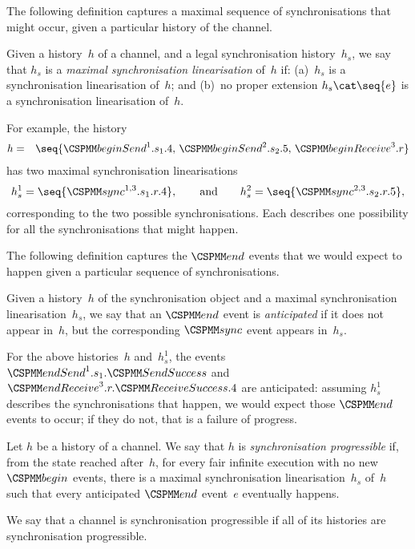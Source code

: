 
The following definition captures a maximal sequence of synchronisations that
might occur, given a particular history of the channel.
%
\begin{definition}
Given a history~$h$ of a channel, and a legal synchronisation history~$h_s$,
we say that $h_s$ is a \emph{maximal synchronisation linearisation} of~$h$ if:
(a)~$h_s$ is a synchronisation linearisation of~$h$; and (b)~no proper
extension $h_s \cat \seq{e}$ is a synchronisation linearisation of~$h$.
\end{definition}
%
For example, the history 
\begin{eqnarray*}
h & = &\seq{\beginSend^1.s_1.4,\, \beginSend^2.s_2.5,\, \beginReceive^3.r }
\end{eqnarray*}
has two maximal synchronisation linearisations
\[
h_s^1  =   \seq{\sync^{1,3}.s_1.r.4}, \qquad\mbox{and}\qquad
h_s^2  =  \seq{\sync^{2,3}.s_2.r.5},
\]
corresponding to the two possible synchronisations.  Each describes one
possibility for all the synchronisations that might happen. 


The following definition captures the $\End$ events that we would expect to
happen given a particular sequence of synchronisations.
%
\begin{definition}
Given a history~$h$ of the synchronisation object and a maximal
synchronisation linearisation~$h_s$, we say that an $\End$ event is
\emph{anticipated} if it does not appear in~$h$, but the corresponding $\sync$
event appears in~$h_s$.
\end{definition}
%
For the above histories~$h$ and~$h_s^1$, the events
$\endSend^1.s_1.\SendSuccess$ and $\endReceive^3.r.\ReceiveSuccess.4$  are
anticipated: assuming $h_s^1$ describes the synchronisations that happen, we
would expect those $\End$ events to occur; if they do not, that is a failure
of progress.


\begin{definition}
Let $h$ be a history of a channel.  We say that $h$ is \emph{synchronisation
  progressible} if, from the state reached after~$h$, for every fair infinite
execution with no new $\Begin$ events, there is a maximal synchronisation
  linearisation~$h_s$ of~$h$ such that every anticipated $\End$ event~$e$
  eventually happens.

We say that a channel is synchronisation progressible if all of its histories
are synchronisation progressible.
\end{definition}

